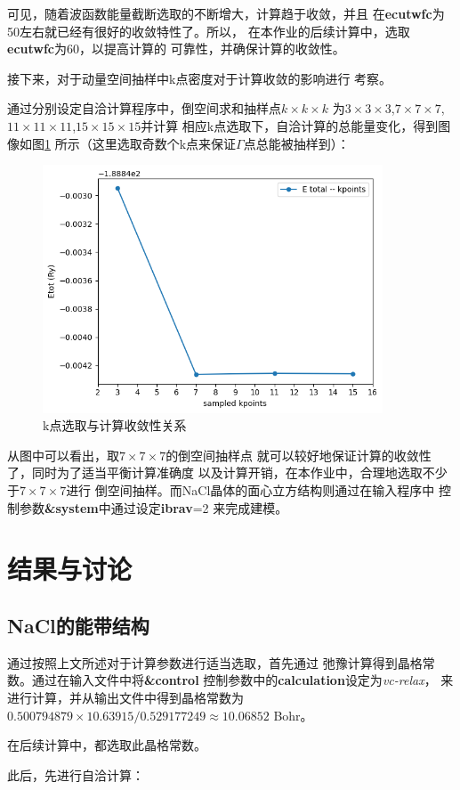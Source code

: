 \documentclass[UTF8]{ctexart}
\numberwithin{figure}{section}  %
\numberwithin{table}{section}
\numberwithin{equation}{section}
\begin{document}
        可见，随着波函数能量截断选取的不断增大，计算趋于收敛，并且
    在\textbf{ecutwfc}为50左右就已经有很好的收敛特性了。所以，
    在本作业的后续计算中，选取\textbf{ecutwfc}为60，以提高计算的
    可靠性，并确保计算的收敛性。\par 
        接下来，对于动量空间抽样中k点密度对于计算收敛的影响进行
    考察。\par 
        通过分别设定自洽计算程序中，倒空间求和抽样点$k\times k \times k$
    为$3\times 3\times 3$,$7\times 7\times 7$,
    $11\times 11\times 11$,$15\times 15\times 15$并计算
    相应k点选取下，自洽计算的总能量变化，得到图像如图\ref{Fig:4}
    所示（这里选取奇数个k点来保证$\Gamma$点总能被抽样到）：

    \begin{figure}[H]
        \centering
        \includegraphics[width=0.9\textwidth]{kpoints_converge.png}
        \caption{k点选取与计算收敛性关系}
        \label{Fig:4}
    \end{figure}

        从图中可以看出，取$7\times 7\times 7$的倒空间抽样点
    就可以较好地保证计算的收敛性了，同时为了适当平衡计算准确度
    以及计算开销，在本作业中，合理地选取不少于$7\times 7\times 7$进行
    倒空间抽样。而NaCl晶体的面心立方结构则通过在输入程序中
    控制参数\textbf{\&system}中通过设定\textbf{ibrav}=2
    来完成建模。


\clearpage

\section{结果与讨论}

    \subsection{NaCl的能带结构}
        通过按照上文所述对于计算参数进行适当选取，首先通过
    弛豫计算得到晶格常数。通过在输入文件中将\textbf{\&control}
    控制参数中的\textbf{calculation}设定为\emph{vc-relax}，
    来进行计算，并从输出文件中得到晶格常数为
    $0.500794879 \times 10.63915 /  0.529177249 \approx 10.06852$
    Bohr。\par 
        在后续计算中，都选取此晶格常数。\par 
        此后，先进行自洽计算：
\end{document}
